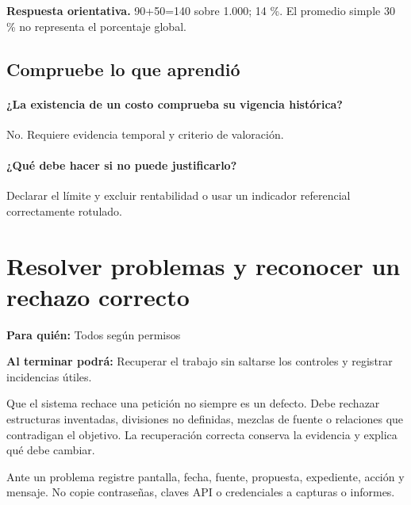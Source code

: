 \textbf{Respuesta orientativa.} 90+50=140 sobre 1.000; 14 \%. El promedio simple 30 \% no representa el porcentaje global.

\subsection{Compruebe lo que aprendió}
\paragraph{¿La existencia de un costo comprueba su vigencia histórica?} No. Requiere evidencia temporal y criterio de valoración.

\paragraph{¿Qué debe hacer si no puede justificarlo?} Declarar el límite y excluir rentabilidad o usar un indicador referencial correctamente rotulado.


\section{Resolver problemas y reconocer un rechazo correcto}
\label{unidad:QA01}
\textbf{Para quién:} Todos según permisos\par
\textbf{Al terminar podrá:} Recuperar el trabajo sin saltarse los controles y registrar incidencias útiles.

Que el sistema rechace una petición no siempre es un defecto. Debe rechazar estructuras inventadas, divisiones no definidas, mezclas de fuente o relaciones que contradigan el objetivo. La recuperación correcta conserva la evidencia y explica qué debe cambiar.

Ante un problema registre pantalla, fecha, fuente, propuesta, expediente, acción y mensaje. No copie contraseñas, claves API o credenciales a capturas o informes.

